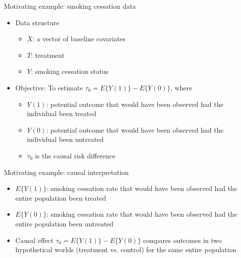\documentclass[12pt,aspectratio=169]{beamer}
\begin{document}
\begin{frame}{Motivating example: smoking cessation data}


 
\begin{itemize}
\item  Data structure

\begin{itemize}
\item $X$: a vector of baseline covariates

\item $T$:  treatment

\item $Y$: smoking cessation status 

\end{itemize}

\item \colorbox{blue!10}{Objective}:  To estimate  {\color{cred} $\tau_0=E\{Y(1)\}-E\{Y(0)\}$}, where

\begin{itemize}
\item
$Y(1)$:  potential outcome that would have been observed had the  individual been treated


\item

$Y(0)$: potential outcome that would have been observed had the  individual been untreated

\item $\tau_0$ is the {\color{cred} causal risk difference}
\end{itemize}


\end{itemize}

\end{frame}




\begin{frame}{Motivating example: causal interpretation}
  \begin{itemize}
 
 \item
$E\{Y(1)\}$:  smoking cessation rate that would have been observed had the entire population been treated


\item
$E\{Y(0)\}$: smoking cessation rate that would have been observed had the entire population been untreated


\item

Causal effect $\tau_0=E\{Y(1)\}-E\{Y(0)\}$ compares  outcomes in two hypothetical worlds (treatment vs. control) for {\color{cred}  the same entire population} 

  \end{itemize}
\end{frame}
\end{document}
